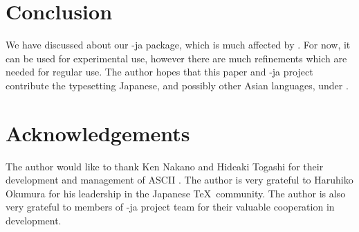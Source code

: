 \documentclass{ajt}
\begin{document}
\section{Conclusion}
We have discussed about our \LuaTeX-ja package, which is much affected
by \pTeX. For now, it can be used for experimental use, however there
are much refinements which are needed for regular use. The author hopes
that this paper and \LuaTeX-ja project contribute the typesetting Japanese,
and possibly other Asian languages, under \LuaTeX.

\section*{Acknowledgements}
The author would like to thank Ken Nakano and Hideaki Togashi for their
development and management of ASCII \pTeX. The author is very grateful to Haruhiko
Okumura for his leadership in the Japanese \TeX\ community. The author
is also very grateful to members of \LuaTeX-ja project team for their
valuable cooperation in development.
\end{document}
